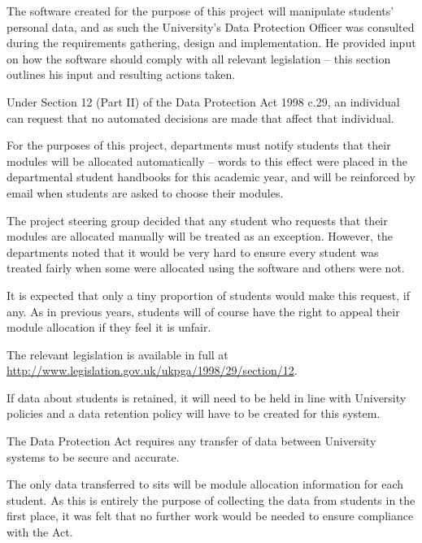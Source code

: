 \documentclass[draft]{scrartcl}
\begin{document}
The software created for the purpose of this project will manipulate students'
personal data, and as such the University's Data Protection Officer was
consulted during the requirements gathering, design and implementation. He
provided input on how the software should comply with all relevant legislation
-- this section outlines his input and resulting actions taken.


Under Section 12 (Part II) of the Data Protection Act 1998 c.29, an individual
can request that no automated decisions are made that affect that individual.

For the purposes of this project, departments must notify students that their
modules will be allocated automatically -- words to this effect were placed in
the departmental student handbooks for this academic year, and will be
reinforced by email when students are asked to choose their modules.

The project steering group decided that any student who requests that their
modules are allocated manually will be treated as an exception. However, the
departments noted that it would be very hard to ensure every student was
treated fairly when some were allocated using the software and others were
not.

It is expected that only a tiny proportion of students would make this
request, if any. As in previous years, students will of course have the right
to appeal their module allocation if they feel it is unfair.

The relevant legislation is available in full at
\url{http://www.legislation.gov.uk/ukpga/1998/29/section/12}.


If data about students is retained, it will need to be held in line with
University policies and a data retention policy will have to be created for
this system.


The Data Protection Act requires any transfer of data between University
systems to be secure and accurate.

The only data transferred to \gls{sits} will be module allocation information
for each student. As this is entirely the purpose of collecting the data from
students in the first place, it was felt that no further work would be needed
to ensure compliance with the Act.
\end{document}

